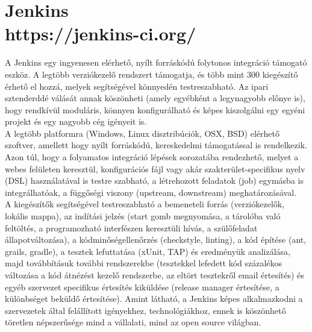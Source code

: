 \section{Jenkins\\\small{https://jenkins-ci.org/}}
A Jenkins egy ingyenesen elérhető, nyílt forráskódú folytonos integráció támogató eszköz. A legtöbb verziókezelő rendszert támogatja, és több mint 300 kiegészítő érhető el hozzá, melyek segítségével könnyedén testreszabható. Az ipari sztenderddé válását annak köszönheti (amely egyébként a legynagyobb előnye is), hogy rendkívül moduláris, könnyen konfigurálható és képes kiszolgálni egy egyéni projekt és egy nagyobb cég igényeit is.\hfill\\
A legtöbb platformra (Windows, Linux disztribúciók, OSX, BSD) elérhető szoftver, amellett hogy nyílt forráskódú, kereskedelmi támogatással is rendelkezik.\hfill\\
Azon túl, hogy a folyamatos integráció lépések sorozatába rendezhető, melyet a webes felületen keresztül, konfigurációs fájl vagy akár szakterület-specifikus nyelv (DSL) használatával is testre szabható, a létrehozott feladatok (job) egymásba is integrálhatóak, a függőségi viszony (upstream, downstream) meghatározásával.\hfill\\
A kiegészítők segítségével testreszabható a bemeneteli forrás (verziókezelők, lokális mappa), az indítási jelzés (start gomb megnyomása, a tárolóba való feltöltés, a programozható interfészen keresztüli hívás, a szülőfeladat állapotváltozása), a kódminőségellenőrzés (checkstyle, linting), a kód építése (ant, grails, gradle), a tesztek lefuttatása (xUnit, TAP) és eredményük analizálása, majd továbbításuk további rendszerekbe (tesztekkel lefedett kód százalékos változása a kód átnézést kezelő rendszerbe, az eltört tesztekről email értesítés) és egyéb szervezet specifikus értesítés kiküldése (release manager értesítése, a különbséget beküldő értesítése).
Amint látható, a Jenkins képes alkalmazkodni a szervezetek által felállított igényekhez, technológiákhoz, ennek is köszönhető töretlen népszerűsége mind a vállalati, mind az open source világban.


